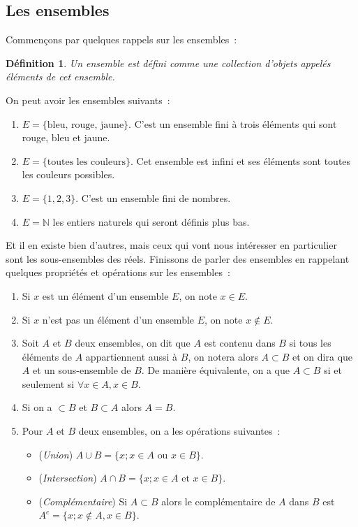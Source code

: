 \documentclass[a4paper, 12pt, french, twoside]{article}
\newtheorem{defi}[theorem]{Définition}
\newcommand{\Nn}{{\mathbb{N}}}
\begin{document}
\subsection{Les ensembles}
Commençons par quelques rappels sur les ensembles :
\begin{defi}
  Un ensemble est défini comme une collection d'objets appelés éléments de cet ensemble.   
\end{defi}
On peut avoir les ensembles suivants : 
\begin{enumerate}
    \item $E=\{\text{bleu, rouge, jaune}\}$. C'est un ensemble fini à trois éléments qui sont rouge, bleu et jaune. 
    \item $E=\{\text{toutes les couleurs}\}$. Cet ensemble est infini et ses éléments sont toutes les couleurs possibles. 
    \item $E=\{1,2,3\}$. C'est un ensemble fini de nombres. 
    \item $E=\Nn$ les entiers naturels qui seront définis plus bas. 
\end{enumerate}
Et il en existe bien d'autres, mais ceux qui vont nous intéresser en particulier sont les sous-ensembles des réels. Finissons de parler des ensembles en rappelant quelques propriétés et opérations sur les ensembles : 
\begin{enumerate}
    \item Si $x$ est un élément d'un ensemble $E$, on note $x\in E$.
    \item Si $x$ n'est pas un élément d'un ensemble $E$, on note $x\notin E$.
    \item Soit $A$ et $B$ deux ensembles, on dit que $A$ est contenu dans $B$ si tous les éléments de $A$ appartiennent aussi à $B$, on notera alors $A\subset B$ et on dira que $A$ et un sous-ensemble de $B$. De manière équivalente, on a que $A\subset B$ si et seulement si $\forall x\in A, x\in B$.
    \item Si on a $\subset B$ et $B\subset A$ alors $A=B$. 
    \item Pour $A$ et $B$ deux ensembles, on a les opérations suivantes :
    \begin{itemize}
        \item (\textit{Union}) $A\cup B=\{x; x\in A \text{ ou } x\in B\}$. 
        \item (\textit{Intersection}) $A\cap B=\{x; x\in A \text{ et } x\in B\}$. 
        \item (\textit{Complémentaire}) Si $A\subset B$ alors le complémentaire de $A$ dans $B$ est $A^c=\{x; x\notin A, x\in B\}$. 
    \end{itemize}
\end{enumerate}
\end{document}

